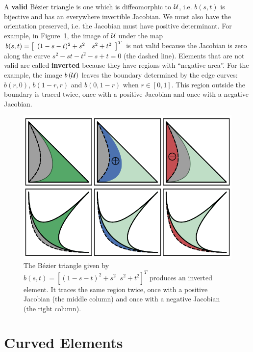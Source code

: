 A \textbf{valid} B\'{e}zier triangle is one which is
diffeomorphic to \(\mathcal{U}\), i.e. \(b(s, t)\) is bijective and has
an everywhere invertible Jacobian. We must also have the orientation
preserved, i.e. the Jacobian must have positive determinant. For example, in
Figure~\ref{fig:inverted-element}, the image of \(\mathcal{U}\) under
the map \(b(s, t) = \left[\begin{array}{c c} (1 - s - t)^2 + s^2 & s^2 + t^2
\end{array}\right]^T\) is not valid because the Jacobian is zero along
the curve \(s^2 - st - t^2 - s + t = 0\) (the dashed line). Elements that
are not valid are called \textbf{inverted} because they have regions with
``negative area''. For the example, the image \(b\left(\mathcal{U}\right)\)
leaves the boundary determined by the edge curves: \(b(r, 0)\),
\(b(1 - r, r)\) and \(b(0, 1 - r)\) when \(r \in \left[0, 1\right]\).
This region outside the boundary is traced twice, once with
a positive Jacobian and once with a negative Jacobian.
\begin{figure}
  \includegraphics{../images/curved-mesh/inverted_element.pdf}
  \centering
  \captionsetup{width=.75\linewidth}
  \caption{The B\'{e}zier triangle given by \(b(s, t) = \left[
    (1 - s - t)^2 + s^2 \; \; s^2 + t^2 \right]^T\) produces an
    inverted element. It traces the same region twice, once with
    a positive Jacobian (the middle column) and once with a negative
    Jacobian (the right column).}
  \label{fig:inverted-element}
\end{figure}

\section{Curved Elements}\label{sec:curved-elements}

